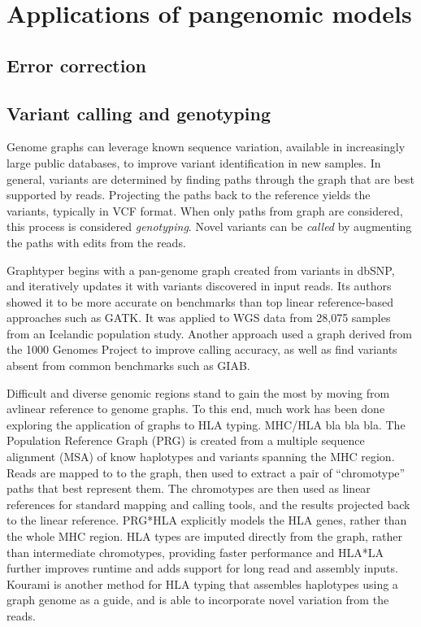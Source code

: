 \section{Applications of pangenomic models}

\subsection{Error correction}

\subsection{Variant calling and genotyping}

Genome graphs can leverage known sequence variation, available in increasingly large public databases, to improve variant identification in new samples.
In general, variants are determined by finding paths through the graph that are best supported by reads.
Projecting the paths back to the reference yields the variants, typically in VCF format.
When only paths from graph are considered, this process is considered \emph{genotyping}.
Novel variants can be \emph{called} by augmenting the paths with edits from the reads.

Graphtyper \cite{eggertsson2017graphtyper} begins with a pan-genome graph created from variants in dbSNP, and iteratively updates it with variants discovered in input reads.
Its authors showed it to be more accurate on benchmarks than top linear reference-based approaches such as GATK.
It was applied to WGS data from 28,075 samples from an Icelandic population study.
Another approach used a graph derived from the 1000 Genomes Project \cite{Rakocevic_2019} to improve calling accuracy, as well as find variants absent from common benchmarks such as GIAB.

Difficult and diverse genomic regions stand to gain the most by moving from avlinear reference to genome graphs.
To this end, much work has been done exploring the application of graphs to HLA typing.
MHC/HLA bla bla bla.
The Population Reference Graph (PRG) \cite{dilthey2015improved} is created from a multiple sequence alignment (MSA) of know haplotypes and variants spanning the MHC region.
Reads are mapped to to the graph, then used to extract a pair of ``chromotype'' paths that best represent them.
The chromotypes are then used as linear references for standard mapping and calling tools, and the results projected back to the linear reference.
PRG*HLA \cite{dilthey2018hla} explicitly models the HLA genes, rather than the whole MHC region.
HLA types are imputed directly from the graph, rather than intermediate chromotypes, providing faster performance and  HLA*LA \cite{dilthey2019hla} further improves runtime and adds support for long read and assembly inputs.
Kourami \cite{lee2018kourami} is another method for HLA typing that assembles haplotypes using a graph genome as a guide, and is able to incorporate novel variation from the reads. 

